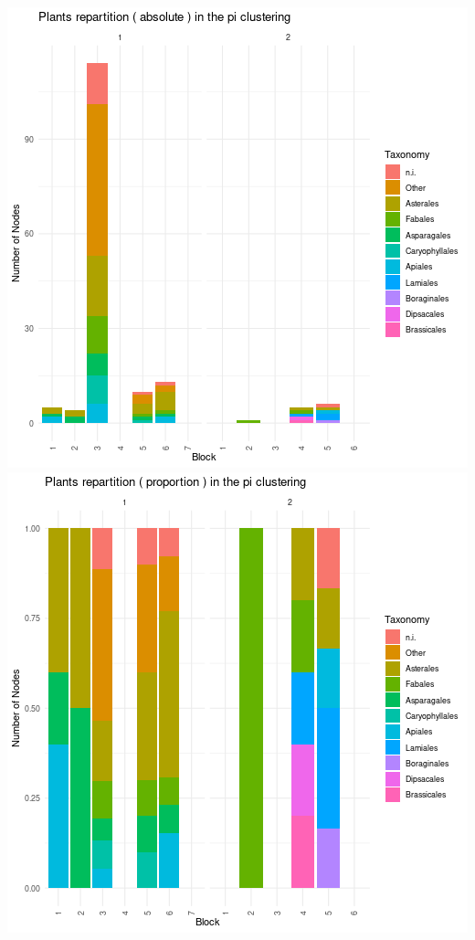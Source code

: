 \includegraphics{./img/1616c974be02698dd5c80725494a650ced9db214.png}\includegraphics{./img/b7dacdc5d5ad116b7b9b2c16dcd4084230bcf8cf.png}

